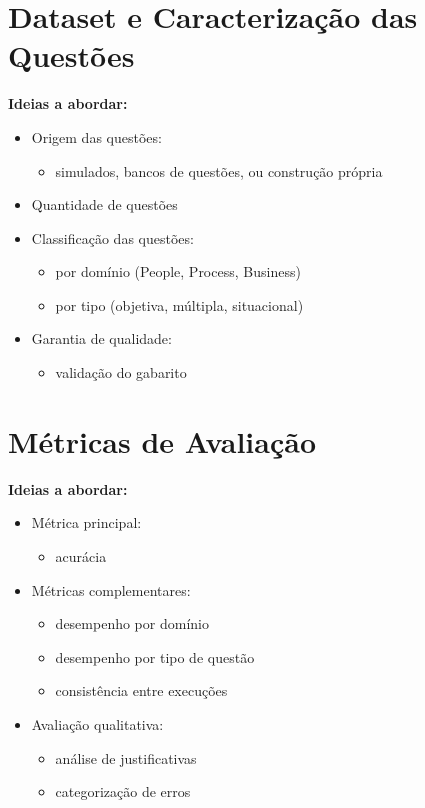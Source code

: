 \section{Dataset e Caracterização das Questões}
\label{subsec:dataset_proposta}

\textbf{Ideias a abordar:}
\begin{itemize}
    \item Origem das questões:
    \begin{itemize}
        \item simulados, bancos de questões, ou construção própria
    \end{itemize}
    \item Quantidade de questões
    \item Classificação das questões:
    \begin{itemize}
        \item por domínio (People, Process, Business)
        \item por tipo (objetiva, múltipla, situacional)
    \end{itemize}
    \item Garantia de qualidade:
    \begin{itemize}
        \item validação do gabarito
    \end{itemize}
\end{itemize}



\section{Métricas de Avaliação}
\label{subsec:metricas}

\textbf{Ideias a abordar:}
\begin{itemize}
    \item Métrica principal:
    \begin{itemize}
        \item acurácia
    \end{itemize}
    \item Métricas complementares:
    \begin{itemize}
        \item desempenho por domínio
        \item desempenho por tipo de questão
        \item consistência entre execuções
    \end{itemize}
    \item Avaliação qualitativa:
    \begin{itemize}
        \item análise de justificativas
        \item categorização de erros
    \end{itemize}
\end{itemize}


